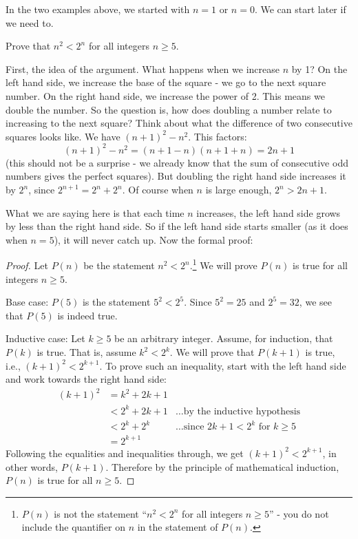 \documentclass[12pt]{article}
\begin{document}
In the two examples above, we started with $n = 1$ or $n = 0$.  We can start later if we need to.

\begin{example}
  Prove that $n^2 < 2^n$ for all integers $n \ge 5$.
  \begin{solution}
  	First, the idea of the argument.  What happens when we increase $n$ by 1?  On the left hand side, we increase the base of the square - we go to the next square number.  On the right hand side, we increase the power of 2.  This means we double the number.  So the question is, how does doubling a number relate to increasing to the next square?  Think about what the difference of two consecutive squares looks like.  We have $(n+1)^2 - n^2$.  This factors: \[(n+1)^2 - n^2 = (n+1-n)(n+1+n) = 2n+1\]
  	(this should not be a surprise - we already know that the sum of consecutive odd numbers gives the perfect squares).  But doubling the right hand side increases it by $2^n$, since $2^{n+1} = 2^n + 2^n$.  Of course when $n$ is large enough, $2^n > 2n + 1$.  
  	
  	What we are saying here is that each time $n$ increases, the left hand side grows by less than the right hand side.  So if the left hand side starts smaller (as it does when $n = 5$), it will never catch up.  Now the formal proof:
  
  \begin{proof}
    Let $P(n)$ be the statement $n^2 < 2^n$.\footnote{$P(n)$ is not the statement ``$n^2 < 2^n$ for all integers $n\ge 5$'' - you do not include the quantifier on $n$ in the statement of $P(n)$.}
    We will prove $P(n)$ is true for all integers $n \ge 5$.
    
    Base case: $P(5)$ is the statement $5^2 < 2^5$.  Since $5^2 = 25$ and $2^5 = 32$, we see that $P(5)$ is indeed true.
    
    Inductive case: Let $k \ge 5$ be an arbitrary integer.  Assume, for induction, that $P(k)$ is true.  That is, assume $k^2 < 2^k$.  We will prove that $P(k+1)$ is true, i.e., $(k+1)^2 < 2^{k+1}$.  To prove such an inequality, start with the left hand side and work towards the right hand side:
    \begin{align*}
      (k+1)^2 & = k^2 + 2k + 1 &\\
       & < 2^k + 2k + 1 &\mbox{\ldots by the inductive hypothesis}\\
       & < 2^k + 2^k  &\mbox{\ldots since $2k + 1 < 2^k$ for $k \ge 5$}\\
       & = 2^{k+1} &
    \end{align*}
    Following the equalities and inequalities through, we get $(k+1)^2 < 2^{k+1}$, in other words, $P(k+1)$.  Therefore by the principle of mathematical induction, $P(n)$ is true for all $n \ge 5$.
  \end{proof}
	\end{solution}
\end{example}
\end{document}
